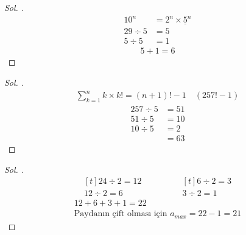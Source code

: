 \documentclass{article}
\theoremstyle{mytheoremstyle}
\theoremstyle{mytheoremstyle}
\theoremstyle{myproblemstyle}
\begin{document}
\begin{proof}[\textit{ Sol. }]
  \begin{align*}
    10^n &= 2^n \times \underline 5^n\\
    29 \div 5 &= 5\\
    5 \div  5 &= 1
  \end{align*}
  \begin{align*}
    5 + 1 = 6
  \end{align*}
\end{proof}

\begin{problem}
\end{problem}

\begin{proof}[\textit{ Sol. }]
  \begin{align*}
    \sum_{k = 1}^{n}k \times k! = (n + 1)! - 1 \quad (257! - 1)
  \end{align*}
  \begin{align*}
    257 \div 5 &= 51\\
    51 \div 5 &= 10\\
    10 \div 5 &= 2\\
    &= 63
  \end{align*}
\end{proof}

\begin{problem}[$ \frac{24!}{2^a} $ çift sayı ise $ a_{max} = ? $]
\end{problem}

\begin{proof}[\textit{ Sol. }]
  \begin{equation*}
    \begin{aligned}[t]
      24 \div 2 = 12\\
      12 \div 2 = 6
    \end{aligned}
    \qquad\qquad
    \begin{aligned}[t]
      6 \div 2 = 3\\
      3 \div 2 = 1
    \end{aligned}
  \end{equation*}
  \begin{gather*}
    12 + 6 + 3 + 1 = 22\\
    \text{Paydanın çift olması için } a_{max} = 22 - 1 = 21
  \end{gather*}
\end{proof}
\end{document}
